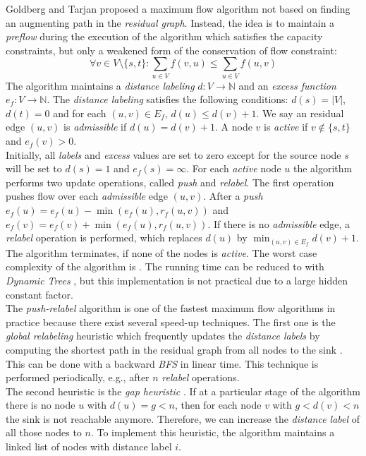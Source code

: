 Goldberg and Tarjan \cite{goldberg1988new} proposed a maximum flow algorithm
not based on finding an augmenting path in the \emph{residual graph}. Instead, the idea is
to maintain a \emph{preflow} during the execution of the algorithm which satisfies the capacity 
constraints, but only a weakened form of the conservation of flow constraint:
\[\forall v \in V \setminus \{s,t\}: \sum_{u \in V} f(v,u) \le \sum_{u \in V} f(u,v)\]
The algorithm maintains a \emph{distance labeling} $d: V \rightarrow \mathbb{N}$ and an 
\emph{excess function} $e_f: V \rightarrow \mathbb{N}$. The \emph{distance labeling} satisfies
the following conditions: $d(s) = |V|$, $d(t) = 0$ and for each $(u,v) \in E_f$, $d(u) \le d(v) + 1$. We say an
residual edge $(u,v)$ is \emph{admissible} if $d(u) = d(v) + 1$. A node $v$ is \emph{active}
if $v \notin \{s,t\}$ and $e_f(v) > 0$.\\
Initially, all \emph{labels} and \emph{excess} values are set to zero except for the source node $s$ will be set to $d(s) = 1$
and $e_f(s) = \infty$. For each \emph{active} node $u$ the algorithm performs two update
operations, called \emph{push} and \emph{relabel}. The first operation pushes flow
over each \emph{admissible} edge $(u,v)$. After a \emph{push} $e_f(u) = e_f(u) - 
\min{(e_f(u),r_f(u,v))}$ and $e_f(v) = e_f(v) + \min{(e_f(u),r_f(u,v))}$. If there is no
\emph{admissible} edge, a \emph{relabel} operation is performed, which replaces $d(u)$ by
$\min_{(u,v) \in E_f} d(v) + 1$. The algorithm terminates, if none of the nodes is \emph{active}.
The worst case complexity of the algorithm is . The running time can be reduced
to  with \emph{Dynamic Trees} \cite{goldberg1988new, sleator1981data}, but this
implementation is not practical due to a large hidden constant factor.\\
The \emph{push-relabel} algorithm is one of the fastest maximum flow algorithms in practice
because there exist several speed-up techniques. The first one is
the \emph{global relabeling} heuristic which frequently updates the \emph{distance labels} by computing
the shortest path in the residual graph from all nodes to the sink \cite{cherkassky1997implementing}.
This can be done with a backward \emph{BFS} in linear time. This technique is performed periodically,
e.g., after $n$ \emph{relabel} operations. \\
The second heuristic is the \emph{gap heuristic} \cite{cherkassky1994fast,derigs1989implementing}.
If at a particular stage of the algorithm there is no node $u$ with $d(u) = g < n$, then for each node
$v$ with $g < d(v) < n$ the sink is not reachable anymore. Therefore, we can increase the \emph{distance
label} of all those nodes to $n$. To implement this heuristic, the algorithm maintains a linked list of
nodes with distance label $i$.

